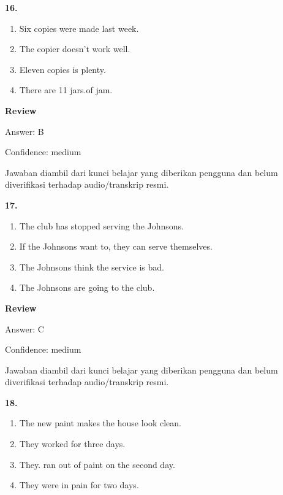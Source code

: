 \documentclass[12pt]{article}
\begin{document}
\vspace{0.25\baselineskip}
\noindent\textbf{16.}
\begin{enumerate}[label=(\Alph*),leftmargin=*,itemsep=0.2em]
\item Six copies were made last week.
\item The copier doesn't work well.
\item Eleven copies is plenty.
\item There are 11 jars.of jam.
\end{enumerate}
\par
\begingroup
\setlength{\parskip}{0pt}
\setlength{\parindent}{0pt}
\textbf{Review}\par
Answer: B\par
Confidence: medium\par
Jawaban diambil dari kunci belajar yang diberikan pengguna dan belum diverifikasi terhadap audio/transkrip resmi.\par
\endgroup
\par
\vspace{0.25\baselineskip}
\noindent\textbf{17.}
\begin{enumerate}[label=(\Alph*),leftmargin=*,itemsep=0.2em]
\item The club has stopped serving the Johnsons.
\item If the Johnsons want to, they can serve themselves.
\item The Johnsons think the service is bad.
\item The Johnsons are going to the club.
\end{enumerate}
\par
\begingroup
\setlength{\parskip}{0pt}
\setlength{\parindent}{0pt}
\textbf{Review}\par
Answer: C\par
Confidence: medium\par
Jawaban diambil dari kunci belajar yang diberikan pengguna dan belum diverifikasi terhadap audio/transkrip resmi.\par
\endgroup
\par
\vspace{0.25\baselineskip}
\noindent\textbf{18.}
\begin{enumerate}[label=(\Alph*),leftmargin=*,itemsep=0.2em]
\item The new paint makes the house look clean.
\item They worked for three days.
\item They. ran out of paint on the second day.
\item They were in pain for two days.
\end{enumerate}
\end{document}
